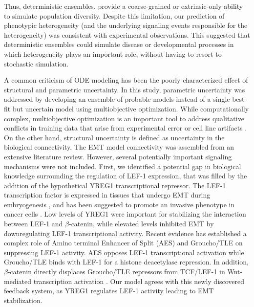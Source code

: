 \documentclass[12pt]{article}
\begin{document}
Thus, deterministic ensembles, provide a coarse-grained or extrinsic-only ability to simulate population diversity. Despite this limitation, our prediction of phenotypic heterogeneity
(and the underlying signaling events responsible for the heterogeneity) was consistent with experimental observations. This suggested that deterministic ensembles could simulate
disease or developmental processes in which heterogeneity plays an important role, without having to resort to stochastic simulation.

A common criticism of ODE modeling has been the poorly characterized effect of structural and parametric uncertainty.
In this study, parametric uncertainty was addressed by developing an ensemble of probable models instead of a single best-fit but uncertain model using multiobjective optimization.
While computationally complex, multiobjective optimization is an important tool to address qualitative conflicts in training data that arise from experimental error or cell line artifacts \citep{Handl:2007fk}. On the other hand, structural uncertainty is defined as uncertainty in the biological connectivity.
The EMT model connectivity was assembled from an extensive literature review. However, several potentially important signaling mechanisms were not included.
First, we identified a potential gap in biological knowledge surrounding the regulation of LEF-1 expression, that was filled by the addition of the hypothetical YREG1 transcriptional repressor.
The LEF-1 transcription factor is expressed in tissues that undergo EMT during embryogenesis \citep{Vega:2004qf,Nawshad:2003ff},
and has been suggested to promote an invasive phenotype in cancer cells \citep{Cano:2000kh,Kim:2002lh}.
Low levels of YREG1 were important for stabilizing the interaction between LEF-1 and $\beta$-catenin, while elevated levels inhibited EMT by downregulating LEF-1 transcriptional activity.
Recent evidence has established a complex role of Amino terminal Enhancer of Split (AES) and Groucho/TLE on suppressing LEF-1 activity.
AES opposes LEF-1 transcriptional activation while Groucho/TLE binds with LEF-1 for a histone deacetylase repression.
In addition, $\beta$-catenin directly displaces Groucho/TLE repressors from TCF/LEF-1 in Wnt-mediated transcription activation \citep{Arce:2009pr, Grumolato2013}.
Our model agrees with this newly discovered feedback system, as YREG1 regulates LEF-1 activity leading to EMT stabilization.
\end{document}

